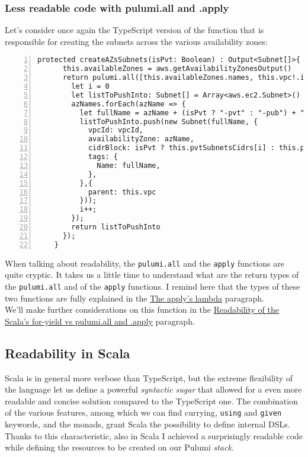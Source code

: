 \subsubsection{Less readable code with pulumi.all and .apply}
\label{sssec:ts-subnets-comparison}
Let's consider once again the TypeScript version of the function that is responsible for creating the subnets across the various availability zones:\\
\begin{minipage}{\linewidth}
  \begin{lstlisting}[numbers=left, numberstyle=\tiny, numbersep=-5pt, stepnumber=1, linewidth=420pt]
    protected createAZsSubnets(isPvt: Boolean) : Output<Subnet[]>{
      this.availableZones = aws.getAvailabilityZonesOutput()
      return pulumi.all([this.availableZones.names, this.vpc!.id]).apply(([azNames, vpcId]) => {
        let i = 0
        let listToPushInto: Subnet[] = Array<aws.ec2.Subnet>()
        azNames.forEach(azName => {
          let fullName = azName + (isPvt ? "-pvt" : "-pub") + "-subnet-typescript"
          listToPushInto.push(new Subnet(fullName, {
            vpcId: vpcId,
            availabilityZone: azName,
            cidrBlock: isPvt ? this.pvtSubnetsCidrs[i] : this.pubSubnetsCidrs[i],
            tags: {
              Name: fullName,
            },
          },{
            parent: this.vpc
          }));
          i++;
        });
        return listToPushInto
      });
    }
  \end{lstlisting}
  \end{minipage}
When talking about readability, the \texttt{pulumi.all} and the \texttt{apply} functions are quite cryptic.
It takes us a little time to understand what are the return types of the \texttt{pulumi.all} and of the \texttt{apply} functions.
I remind here that the types of these two functions are fully explained in the \hyperref[par:ts-lambda]{The apply's lambda} paragraph.\\
We'll make further considerations on this function in the \hyperref[sssec:readability-for-yield]{Readability of the Scala's for-yield vs pulumi.all and .apply} paragraph.

\subsection{Readability in Scala}
Scala is in general more verbose than TypeScript, but the extreme flexibility of the language let us define a powerful \textit{syntactic sugar} that allowed for a even more readable and concise solution compared to the TypeScript one.
The combination of the various features, among which we can find currying, \texttt{using} and \texttt{given} keywords, and the monads, grant Scala the possibility to define \gls{internal DSL}s.
Thanks to this characteristic, also in Scala I achieved a surprisingly readable code while defining the resources to be created on our Pulumi \textit{stack}.


